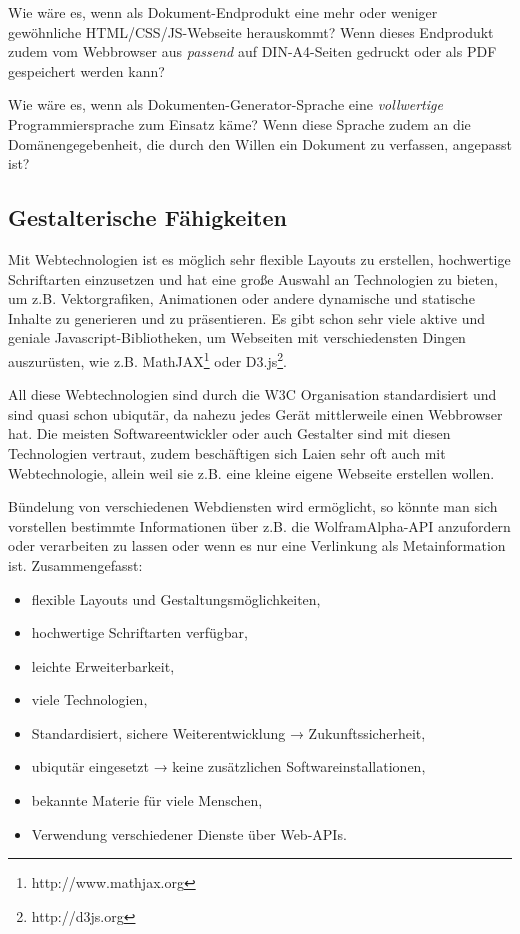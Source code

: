 Wie wäre es, wenn als Dokument-Endprodukt eine mehr oder weniger
gewöhnliche HTML/CSS/JS-Webseite herauskommt?
Wenn dieses Endprodukt zudem vom Webbrowser aus \emph{passend} auf
DIN-A4-Seiten gedruckt oder als PDF gespeichert werden kann?

Wie wäre es, wenn als Dokumenten-\-Generator-\-Sprache eine \emph{vollwertige}
Programmiersprache zum Einsatz käme? Wenn diese Sprache zudem an die
Domänen\-gege\-ben\-heit, die durch den Willen ein Dokument zu verfassen,
angepasst ist?

\subsection{Gestalterische Fähigkeiten}

Mit Webtechnologien ist es möglich sehr flexible Layouts zu erstellen,
hochwertige Schriftarten einzusetzen und hat eine große Auswahl an
Technologien zu bieten, um z.B. Vektorgrafiken, Animationen oder
andere dynamische und statische Inhalte zu generieren und zu
präsentieren. Es gibt schon sehr viele aktive und geniale Javascript-Bibliotheken,
um Webseiten mit verschiedensten Dingen auszurüsten,
wie z.B. MathJAX\footnote{http://www.mathjax.org} oder
D3.js\footnote{http://d3js.org}.

All diese Webtechnologien sind durch die W3C Organisation standardisiert
und sind quasi schon ubiqutär, da nahezu jedes Gerät mittlerweile einen
Webbrowser hat. Die meisten Softwareentwickler oder auch
Gestalter sind mit diesen Technologien vertraut, zudem beschäftigen sich
Laien sehr oft auch mit Webtechnologie, allein weil sie z.B. eine kleine
eigene Webseite erstellen wollen.

Bündelung von verschiedenen Webdiensten wird ermöglicht, so könnte man sich
vorstellen bestimmte Informationen über z.B. die WolframAlpha-API
anzufordern oder verarbeiten zu lassen oder wenn es nur eine Verlinkung
als Metainformation ist. Zusammengefasst:

\begin{itemize}
  \item flexible Layouts und Gestaltungsmöglichkeiten,
  \item hochwertige Schriftarten verfügbar,
  \item leichte Erweiterbarkeit,
  \item viele Technologien,
  \item Standardisiert, sichere Weiterentwicklung → Zukunftssicherheit,
  \item ubiqutär eingesetzt → keine zusätzlichen Softwareinstallationen,
  \item bekannte Materie für viele Menschen,
  \item Verwendung verschiedener Dienste über Web-APIs.
\end{itemize}

